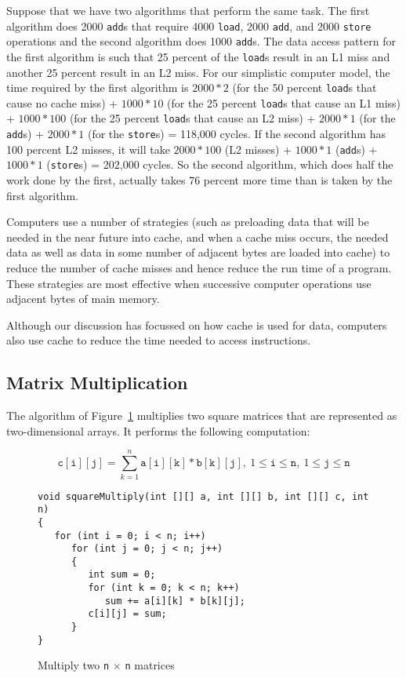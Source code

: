 Suppose that we have two algorithms that perform
the same task. The first algorithm does 2000 {\tt add}s
that require 4000 {\tt load},
2000 {\tt add}, and 2000 {\tt store} operations and the second
algorithm does 1000 {\tt add}s.  The data access pattern for the
first
algorithm is such that 25 percent of the {\tt load}s result in an
L1 miss and another 25 percent result in an L2 miss. For our simplistic
computer model, the time required by the first algorithm is
$2000 * 2$ (for the 50 percent {\tt load}s that cause no cache miss)
+ $1000 * 10$ (for the 25 percent {\tt load}s that cause an L1 miss)
+ $1000 * 100$ (for the 25 percent {\tt load}s that cause an L2 miss)
+ $2000 * 1$ (for the {\tt add}s) + $2000 * 1$ (for the {\tt store}s)
= 118,000 cycles. 
If the second algorithm has 100 percent L2 misses, it will take
$2000 * 100$ (L2 misses) + $1000 * 1$ ({\tt add}s) + $1000 * 1$
({\tt store}s) = 202,000 cycles. So the second algorithm, which
does half the work done by the first, actually takes 76 percent
more time than is taken by the first algorithm.

Computers use a number of strategies (such as preloading
data that will be needed in the near future into cache,
and when a cache miss occurs, the needed data as well as data in
some number of adjacent bytes are loaded into cache) to reduce
the number of cache misses and hence reduce the run time of a program.
These strategies are most effective when successive computer
operations use
adjacent bytes of main memory.

Although our discussion has focussed on how cache is used for data,
computers also use cache to reduce the time needed to access instructions.

\subsection{Matrix Multiplication}

The algorithm of Figure~\ref{prog2:mult}
multiplies two
square matrices that are represented as two-dimensional arrays.
It performs the following computation:


\begin{equation}\label{Eqn2:multiply}
\mathtt{c[i][j]} = \sum_{k=1}^n \mathtt{a[i][k]} * \mathtt{b[k][j]},\  1 \leq \mathtt{i} \leq \mathtt{n},\ 1 \leq \mathtt{j} \leq \mathtt{n} 
\end{equation}
 
\begin{figure}
\begin{verbatim}
void squareMultiply(int [][] a, int [][] b, int [][] c, int n)
{
   for (int i = 0; i < n; i++)
      for (int j = 0; j < n; j++)
      {
         int sum = 0;
         for (int k = 0; k < n; k++)
            sum += a[i][k] * b[k][j];
         c[i][j] = sum;
      }
}
\end{verbatim}
\caption{Multiply two {\tt n} $\times$ {\tt n} matrices
\label{prog2:mult}}
\end{figure}

